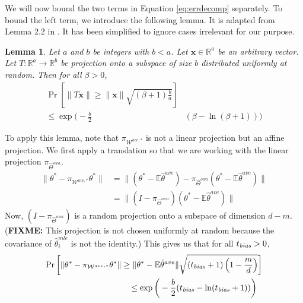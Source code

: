 \documentclass[twoside]{article}
\newtheorem{lemma}{Lemma}
\newcommand{\W}{{\hat \Theta^{\textit{owa}}}}
\newcommand{\Wtave}{{\mathcal{W}^{ave,*}}}
\newcommand{\E}{\mathbb{E}}
\newcommand{\x}{\mathbf{x}}
\newcommand{\w}{\theta}
\newcommand{\wtave}{\E\hat\w^{ave}}
\newcommand{\wmle}{\hat\w^{mle}}
\newcommand{\wstar}{{\w^{*}}}
\newcommand{\tbias}{t_{\text{\textit{bias}}}}
\newcommand{\ltwo}[1]{{\lVert {#1} \rVert}}
\newcommand{\proj}[1]{\pi_{{#1}}}
\newcommand{\prob}[1]{\Pr\left[{#1}\right]}
\newcommand{\fixme}[1]{\textbf{FIXME:} {#1}}
\begin{document}
{%

We will now bound the two terms in Equation \ref{eq:errdecomp} separately.
To bound the left term, we introduce the following lemma.
It is adapted from Lemma 2.2 in \cite{dasgupta2003elementary}.
It has been simplified to ignore cases irrelevant for our purpose.
\begin{lemma}
Let $a$ and $b$ be integers with $b<a$.
Let $\x\in\mathbb{R}^a$ be an arbitrary vector.
Let $T : \mathbb{R}^a \to \mathbb{R}^b$ be projection onto a subspace of size $b$ distributed uniformly at random.
Then for all $\beta>0$,
\begin{equation}
\begin{split}
\prob{\ltwo{T\x} \ge \ltwo\x\sqrt{(\beta + 1)\frac{b}{a}}}&
\\
\le
\exp \bigg(-\frac{b}{2} & (\beta-\ln(\beta+1))\bigg)
\end{split}
\end{equation}
\end{lemma}
To apply this lemma, note that $\proj\Wtave$ is not a linear projection but an affine projection.
We first apply a translation so that we are working with the linear projection $\proj\W$.
\begin{align}
\ltwo{\wstar-\proj\Wtave\wstar}
&=
\ltwo{(\wstar-\wtave)-\proj\W(\wstar-\wtave)}
\\
&=
\ltwo{(I-\proj\W)(\wstar-\wtave)}
\end{align}
Now, $(I-\proj\W)$ is a random projection onto a subspace of dimension $d-m$.
(\fixme{This projection is not chosen uniformly at random because the covariance of $\wmle_i$ is not the identity.})
This gives us that for all $\tbias>0$,
\begin{equation}
\begin{split}
\prob{\ltwo{\wstar-\proj\Wtave\wstar} \ge \ltwo{\wstar-\wtave}\sqrt{(\tbias + 1)\left(1-\frac{m}{d}\right)}}&
\\
\le
\exp \bigg(-\frac{b}{2} (\tbias-\ln(\tbias+1))\bigg)~~&
\end{split}
\end{equation}
}
\end{document}
